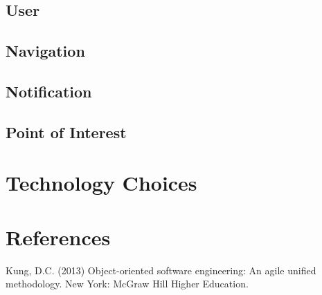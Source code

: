 \documentclass[runningheads,a4paper]{article}
\begin{document}
\subsection {User}

\subsection {Navigation}

\subsection {Notification}

\subsection {Point of Interest}


\section{Technology Choices}

\section{References}
Kung, D.C. (2013) Object-oriented software engineering: An agile unified methodology. New York: McGraw Hill Higher Education.
\end{document}
